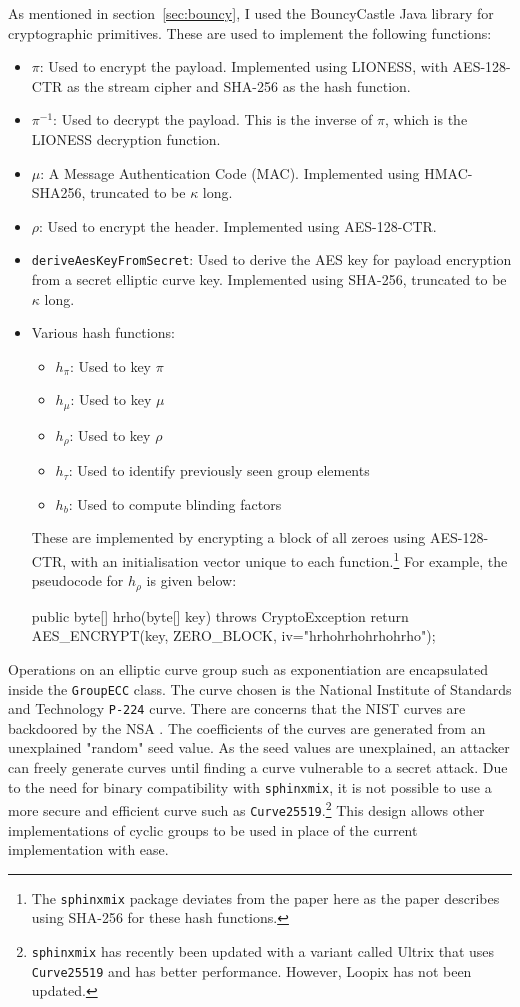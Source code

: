 \documentclass[final,dissertation.tex]{subfiles}
\begin{document}
As mentioned in section~\ref{sec:bouncy}, I used the BouncyCastle Java library for cryptographic primitives. These are used to implement the following functions:

\begin{itemize}
	\item $\pi$: Used to encrypt the payload. Implemented using LIONESS, with AES-128-CTR as the stream cipher and SHA-256 as the hash function.
	\item $\pi^{-1}$: Used to decrypt the payload. This is the inverse of $\pi$, which is the LIONESS decryption function.
	\item $\mu$: A Message Authentication Code (MAC). Implemented using HMAC-SHA256, truncated to be $\kappa$ long.
	\item $\rho$: Used to encrypt the header. Implemented using AES-128-CTR.
	\item \verb|deriveAesKeyFromSecret|: Used to derive the AES key for payload encryption from a secret elliptic curve key. Implemented using SHA-256, truncated to be $\kappa$ long.
	\item Various hash functions:
		\begin{itemize}
			\item $h_\pi$: Used to key $\pi$
			\item $h_\mu$: Used to key $\mu$
			\item $h_\rho$: Used to key $\rho$
			\item $h_\tau$: Used to identify previously seen group elements
			\item $h_b$: Used to compute blinding factors
		\end{itemize}
		These are implemented by encrypting a block of all zeroes using AES-128-CTR, with an initialisation vector unique to each function.\footnote{The \verb|sphinxmix| package deviates from the paper here as the paper describes using SHA-256 for these hash functions.} For example, the pseudocode for $h_\rho$ is given below:
		\begin{javacode}
public byte[] hrho(byte[] key) throws CryptoException {
    return AES_ENCRYPT(key, ZERO_BLOCK, iv="hrhohrhohrhohrho");
}
		\end{javacode}
\end{itemize}

Operations on an elliptic curve group such as exponentiation are encapsulated inside the \verb|GroupECC| class. The curve chosen is the National Institute of Standards and Technology \verb|P-224| curve. There are concerns that the NIST curves are backdoored by the NSA \cite{safecurves}. The coefficients of the curves are generated from an unexplained "random" seed value. As the seed values are unexplained, an attacker can freely generate curves until finding a curve vulnerable to a secret attack. Due to the need for binary compatibility with \verb|sphinxmix|, it is not possible to use a more secure and efficient curve such as \verb|Curve25519|.\footnote{\verb|sphinxmix| has recently been updated with a variant called Ultrix that uses \verb|Curve25519| and has better performance. However, Loopix has not been updated.} This design allows other implementations of cyclic groups to be used in place of the current implementation with ease.
\end{document}
